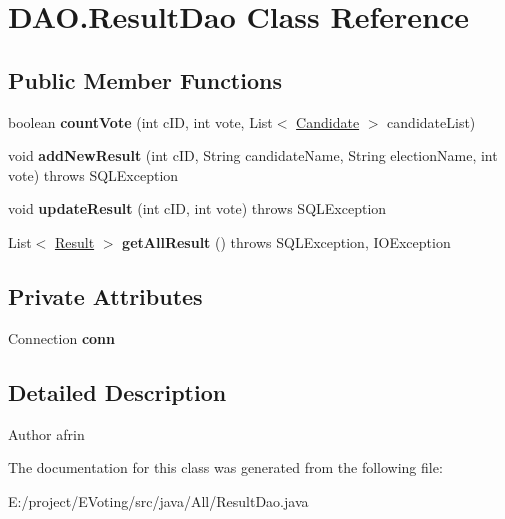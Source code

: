 \hypertarget{class_d_a_o_1_1_result_dao}{}\section{D\+A\+O.\+Result\+Dao Class Reference}
\label{class_d_a_o_1_1_result_dao}
\subsection*{Public Member Functions}
\begin{DoxyCompactItemize}
\item 
\mbox{\label{class_d_a_o_1_1_result_dao_ab101f23801b3cc0ce9472d4bd94607b8}} 
boolean {\bfseries count\+Vote} (int c\+ID, int vote, List$<$ \mbox{\hyperlink{class_models_1_1_candidate}{Candidate}} $>$ candidate\+List)
\item 
\mbox{\label{class_d_a_o_1_1_result_dao_aa2e5080d5ab45f2497299dea2abbdc7e}} 
void {\bfseries add\+New\+Result} (int c\+ID, String candidate\+Name, String election\+Name, int vote)  throws S\+Q\+L\+Exception
\item 
\mbox{\label{class_d_a_o_1_1_result_dao_a7d30f3749c311694f35b06610e5d324b}} 
void {\bfseries update\+Result} (int c\+ID, int vote)  throws S\+Q\+L\+Exception
\item 
\mbox{\label{class_d_a_o_1_1_result_dao_a8669c98372f9e4ce0dbaf845b6b52b3c}} 
List$<$ \mbox{\hyperlink{class_models_1_1_result}{Result}} $>$ {\bfseries get\+All\+Result} ()  throws S\+Q\+L\+Exception, I\+O\+Exception 
\end{DoxyCompactItemize}
\subsection*{Private Attributes}
\begin{DoxyCompactItemize}
\item 
\mbox{\label{class_d_a_o_1_1_result_dao_a6bef704f93381a18cd0d9fb927252d84}} 
Connection {\bfseries conn}
\end{DoxyCompactItemize}


\subsection{Detailed Description}
\begin{DoxyAuthor}{Author}
afrin 
\end{DoxyAuthor}


The documentation for this class was generated from the following file\+:\begin{DoxyCompactItemize}
\item 
E\+:/project/\+E\+Voting/src/java/\+All/Result\+Dao.\+java\end{DoxyCompactItemize}
